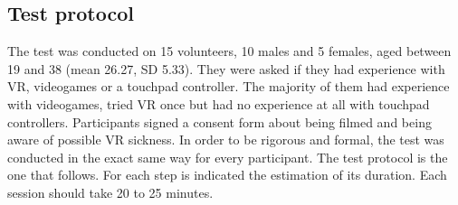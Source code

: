 \documentclass[binding=0.6cm,LaM]{sapthesis}
\begin{document}
\subsection{Test protocol}
The test was conducted on 15 volunteers, 10 males and 5 females, aged between 19 and 38 (mean 26.27, SD 5.33). They were asked if they had experience with VR, videogames or a touchpad controller. The majority of them had experience with videogames, tried VR once but had no experience at all with touchpad controllers. Participants signed a consent form about being filmed and being aware of possible VR sickness.
In order to be rigorous and formal, the test was conducted in the exact same way for every participant. The test protocol is the one that follows. For each step is indicated the estimation of its duration. Each session should take 20 to 25 minutes.
\end{document}
